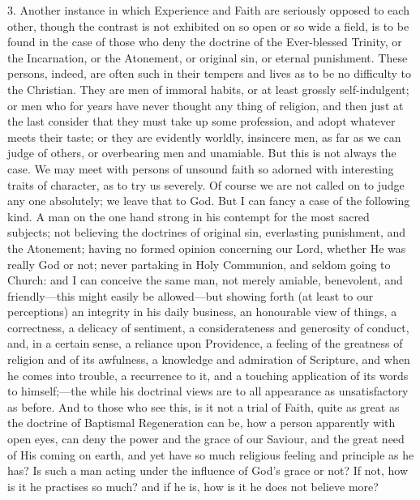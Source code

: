 3. Another instance in which Experience and Faith are seriously
opposed to each other, though the contrast is not exhibited on so open
or so wide a field, is to be found in the case of those who deny the
doctrine of the Ever-blessed Trinity, or the Incarnation, or the
Atonement, or original sin, or eternal punishment. These persons,
indeed, are often such in their tempers and lives as to be no
difficulty to the Christian. They are men of immoral habits, or at
least grossly self-indulgent; or men who for years have never thought
any thing of religion, and then just at the last consider that they
must take up some profession, and adopt whatever meets their taste; or
they are evidently worldly, insincere men, as far as we can judge of
others, or overbearing men and unamiable. But this is not always the
case. We may meet with persons of unsound faith so adorned with
interesting traits of character, as to try us severely. Of course we
are not called on to judge any one absolutely; we leave that to God.
But I can fancy a case of the following kind. A man on the one hand
strong in his contempt for the most sacred subjects; not believing the
doctrines of original sin, everlasting punishment, and the Atonement;
having no formed opinion concerning our Lord, whether He was really
God or not; never partaking in Holy Communion, and seldom going to
Church: and I can conceive the same man, not merely amiable,
benevolent, and friendly—this might easily be allowed—but showing
forth (at least to our perceptions) an integrity in his daily
business, an honourable view of things, a correctness, a delicacy of
sentiment, a considerateness and generosity of conduct, and, in a
certain sense, a reliance upon Providence, a feeling of the greatness
of religion and of its awfulness, a knowledge and admiration of
Scripture, and when he comes into trouble, a recurrence to it, and a
touching application of its words to himself;—the while his
doctrinal views are to all appearance as unsatisfactory as before. And
to those who see this, is it not a trial of Faith, quite as great as
the doctrine of Baptismal Regeneration can be, how a person apparently
with open eyes, can deny the power and the grace of our Saviour, and
the great need of His coming on earth, and yet have so much religious
feeling and principle as he has? Is such a man acting under the
influence of God's grace or not? If not, how is it he practises so
much? and if he is, how is it he does not believe more?


